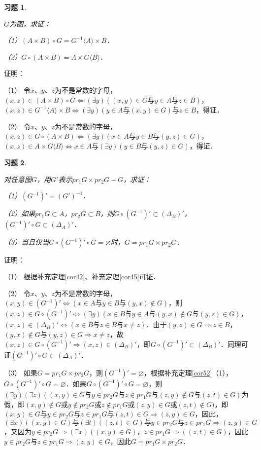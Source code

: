 \documentclass[12pt, a4paper, oneside]{book}
\newtheorem{exer}{习题}
\begin{document}
			\begin{exer}\label{exer47}
				\hfill\par
				$G$为图，求证：
				\par
				（1）$(A\times B)\circ G=G^{-1}\langle A \rangle \times B$．
				\par
				（2）$G\circ (A\times B)=A\times G\langle B \rangle $．
			\end{exer}
			证明：
			\par
			（1）	令$x$、$y$、$z$为不是常数的字母，$(x, z)\in (A\times B)\circ G\Leftrightarrow (\exists y)((x, y)\in G\text{与}y\in A\text{与}z\in B)$，$(x, z)\in G^{-1}\langle A \rangle \times B\Leftrightarrow (\exists y)(y\in A\text{与}(x, y)\in G)\text{与}z\in B$，得证．
			\par
			（2）	令$x$、$y$、$z$为不是常数的字母，$(x, z)\in G\circ (A\times B)\Leftrightarrow (\exists y)(x\in A\text{与}y\in B\text{与}(y, z)\in G)$，$(x, z)\in A\times G\langle B \rangle \Leftrightarrow x\in A\text{与}(\exists y)(y\in B\text{与}(y, z)\in G)$，得证．
			
			\begin{exer}\label{exer48}
				\hfill\par
				对任意图$G$，用$G'$表示$pr_1G\times pr_2G-G$，求证：
				\par
				（1）$(G^{-1})'=(G')^{-1}$．
				\par
				（2）如果$pr_1G\subset A$，$pr_2G\subset B$，则$G\circ (G^{-1})'\subset (\Delta_B)'$，$(G^{-1})' \circ G\subset (\Delta_A)'$．
				\par
				（3）当且仅当$G\circ (G^{-1})'\circ G=\varnothing$时，$G=pr_1G\times pr_2G$．
			\end{exer}
			证明：
			\par
			（1）	根据补充定理\ref{cor42}、补充定理\ref{cor45}可证．
			\par
			（2）	令$x$、$y$、$z$为不是常数的字母，$(x, y)\in (G^{-1})'\Leftrightarrow (x\in A\text{与}y\in B\text{与}(y, x)\notin G)$，则$(x, z)\in G\circ (G^{-1})'\Leftrightarrow (\exists y)(x\in B\text{与}y\in A\text{与}(y, x)\notin G\text{与}(y, z)\in G)$，$(x, z)\in (\Delta_B)'\Leftrightarrow (x\in B\text{与}z\in B\text{与}x\neq z)$．由于$(y, z)\in G\Rightarrow z\in B$，$(y, x)\notin G\text{与}(y, z)\in G\Rightarrow x\neq z$，故$(x, z)\in G\circ (G^{-1})'\Rightarrow (x, z)\in (\Delta_B)'$，即$G\circ (G^{-1})'\subset (\Delta_B)'$．同理可证$(G^{-1})' \circ G\subset (\Delta_A)'$．
			\par
			（3）	如果$G=pr_1G\times pr_2G$，则$(G^{-1})' = \varnothing$，根据补充定理\ref{cor52}（1），$G\circ (G^{-1})'\circ G=\varnothing$．如果$G\circ (G^{-1})'\circ G=\varnothing$，则$(\exists y)(\exists z)((x, y)\in G\text{与}y\in pr_2G\text{与}z\in pr_1G\text{与}(z, y)\notin G\text{与}(z, t)\in G)$为假，即$(x, y)\notin G\text{或}y\notin pr_2G\text{或}z\notin pr_1G\text{或}(z, y)\in G\text{或}(z, t)\notin G)$，即$(x, y)\in G\text{与}y\in pr_2G\text{与}z\in pr_1G\text{与}(z, t)\in G\Rightarrow (z, y)\in G$，因此，$(\exists x)((x, y)\in G)\text{与}(\exists t)((z, t)\in G)\text{与}y\in pr_2G\text{与}z\in pr_1G\Rightarrow (z, y)\in G$，又因为$y\in pr_2G\Rightarrow (\exists x)((x, y)\in G)$，$z\in pr_1G\Rightarrow ((z, t)\in G)$，因此$y\in pr_2G\text{与}z\in pr_1G\Rightarrow (z, y)\in G$，因此$G=pr_1G\times pr_2G$．
			
\end{document}
